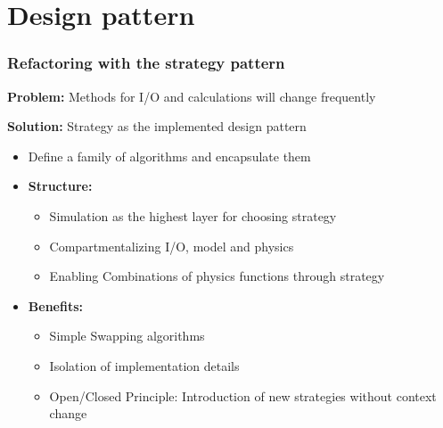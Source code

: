 \section{Design pattern}

\begin{frame}
    \frametitle{Refactoring with the strategy pattern}
    \textbf{Problem:} Methods for I/O and calculations will change frequently

    \textbf{Solution:} Strategy as the implemented design pattern

    \begin{itemize}
        \item Define a family of algorithms and encapsulate them
        \item \textbf{Structure: } 
        \begin{itemize}
            \item Simulation as the highest layer for choosing strategy
            \item Compartmentalizing I/O, model and physics
            \item Enabling Combinations of physics functions through strategy
        \end{itemize}
        \item \textbf{Benefits: }
        \begin{itemize}
            \item Simple Swapping algorithms
            \item Isolation of implementation details
            \item Open/Closed Principle: Introduction of new strategies without context change
        \end{itemize}
    \end{itemize}
\end{frame}